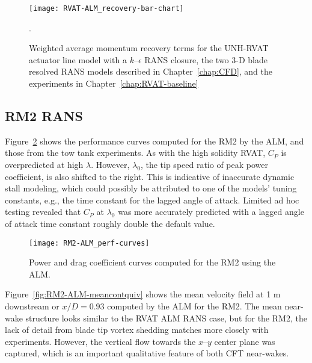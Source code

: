 \begin{figure}
    \centering
    
    \texttt{[image: RVAT-ALM\_recovery-bar-chart]}

    \caption{Weighted average momentum recovery terms for the UNH-RVAT actuator
        line model with a $k$--$\epsilon$ RANS closure, the two 3-D blade resolved
        RANS models described in Chapter~\ref{chap:CFD}, and the experiments in
        Chapter~\ref{chap:RVAT-baseline}}.
    
    \label{fig:RVAT-ALM-recovery}
\end{figure}


\subsection{RM2 RANS}

Figure~\ref{fig:RM2-ALM-perf-curves} shows the performance curves computed for
the RM2 by the ALM, and those from the tow tank experiments. As with the high
solidity RVAT, $C_P$ is overpredicted at high $\lambda$. However, $\lambda_0$,
the tip speed ratio of peak power coefficient, is also shifted to the right.
This is indicative of inaccurate dynamic stall modeling, which could possibly be
attributed to one of the models' tuning constants, e.g., the time constant for
the lagged angle of attack. Limited ad hoc testing revealed that $C_P$ at
$\lambda_0$ was more accurately predicted with a lagged angle of attack time
constant roughly double the default value.

\begin{figure}
    \centering
    
    \texttt{[image: RM2-ALM\_perf-curves]}
    
    \caption{Power and drag coefficient curves computed for the RM2 using the
        ALM.}
    
    \label{fig:RM2-ALM-perf-curves}
\end{figure}

Figure~\ref{fig:RM2-ALM-meancontquiv} shows the mean velocity field at 1 m
downstream or $x/D=0.93$ computed by the ALM for the RM2. The mean near-wake
structure looks similar to the RVAT ALM RANS case, but for the RM2, the lack of
detail from blade tip vortex shedding matches more closely with experiments.
However, the vertical flow towards the $x$--$y$ center plane was captured, which
is an important qualitative feature of both CFT near-wakes.

